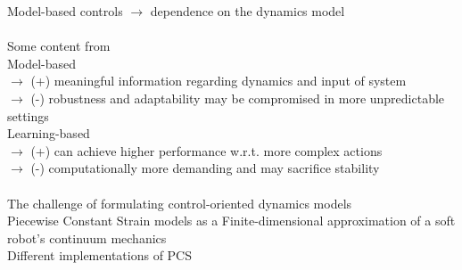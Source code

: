 Model-based controls $\rightarrow$ dependence on the dynamics model \cite{della_santina_model-based_2023}\\
\\  %
Some content from \cite{brunke_safe_2022}\\
Model-based\\
$\rightarrow$ (+) meaningful information regarding dynamics and input of system\\
$\rightarrow$ (-) robustness and adaptability may be compromised in more unpredictable settings \cite{rakhmatillaev_integrative_2025}\\  
Learning-based\\
$\rightarrow$ (+) can achieve higher performance w.r.t. more complex actions\\
$\rightarrow$ (-) computationally more demanding and may sacrifice stability \cite{rakhmatillaev_integrative_2025}\\
\\
The challenge of formulating control-oriented dynamics models\\     %
Piecewise Constant Strain models as a Finite-dimensional            %
approximation of a soft robot's continuum mechanics\\
Different implementations of PCS                                    %